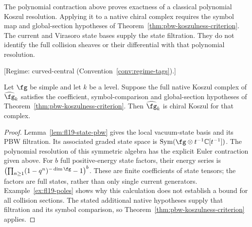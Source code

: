 \begin{remark}
\label{rem:classical-to-chiral-koszul}
The polynomial contraction above proves exactness of a classical polynomial Koszul resolution.
Applying it to a native chiral complex requires the symbol map and global-section hypotheses of Theorem~\ref{thm:pbw-koszulness-criterion}.
The current and Virasoro state bases supply the state filtration.
They do not identify the full collision sheaves or their differential with that polynomial resolution.
\end{remark}

\begin{theorem}
\label{thm:km-chiral-koszul}
\textup{[Regime: curved-central
\textup{(}Convention~\textup{\ref{conv:regime-tags})}.]}

Let $\fg$ be simple and let $k$ be a level.
Suppose the full native Koszul complex of $\widehat{\fg}_k$ satisfies the coefficient, symbol-comparison and global-section hypotheses of Theorem~\ref{thm:pbw-koszulness-criterion}.
Then $\widehat{\fg}_k$ is chiral Koszul for that complex.
\end{theorem}
\begin{proof}
Lemma~\ref{lem:fl19-state-pbw} gives the local vacuum-state basis and its PBW filtration.
Its associated graded state space is $\operatorname{Sym}(\fg\otimes t^{-1}\mathbb C[t^{-1}])$.
The polynomial resolution of this symmetric algebra has the explicit Euler contraction given above.
For $b$ full positive-energy state factors, their energy series is
$\bigl(\prod_{n\ge1}(1-q^n)^{-\dim\fg}-1\bigr)^b$.
These are finite coefficients of state tensors; the factors are full states, rather than only single current generators.
Example~\ref{ex:fl19-poles} shows why this calculation does not establish a bound for all collision sections.
The stated additional native hypotheses supply that filtration and its symbol comparison, so Theorem~\ref{thm:pbw-koszulness-criterion} applies.
\end{proof}

